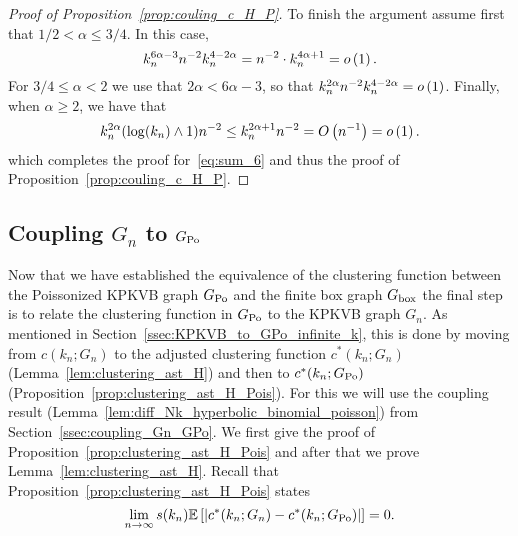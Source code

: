 \begin{proof}[Proof of Proposition~\ref{prop:couling_c_H_P}]
To finish the argument assume first that $1/2 <\alpha \leq 3/4$. In this case,
\[
	k_n^{6\alpha -3}  n^{-2} k_n^{4 - 2\alpha} = 
	n^{-2} \cdot k_n^{4\alpha +1} = o\left(1\right).
\]
For $3/4 \le \alpha < 2$ we use that $2\alpha < 6\alpha - 3$, so that $k_n^{2\alpha} n^{-2} k_n^{4 - 2\alpha} = o\left(1\right)$. Finally, when $\alpha \geq 2$, we have that
\[
	k_n^{2\alpha} (\log(k_n) \wedge 1) n^{-2} \le k_n^{2\alpha + 1} n^{-2} = O\left(n^{-1}\right) = o\left(1\right).
\] 
which completes the proof for~\eqref{eq:sum_6} and thus the proof of Proposition~\ref{prop:couling_c_H_P}.
\end{proof}

\subsection{Coupling $G_n$ to $G_{{\mathrm{Po}}}$}\label{ssec:coupling_H_HP}

Now that we have established the equivalence of the clustering function between the Poissonized KPKVB graph $G_{{\mathrm{Po}}}$ and the finite box graph $G_{\mathrm{box}}$ the final step is to relate the clustering function in $G_{{\mathrm{Po}}}$ to the KPKVB graph $G_n$. As mentioned in Section~\ref{ssec:KPKVB_to_GPo_infinite_k}, this is done by moving from $c(k_n; G_n)$ to the adjusted clustering function $c^\ast(k_n; G_n)$ (Lemma~\ref{lem:clustering_ast_H}) and then to $c^\ast(k_n; G_{{\mathrm{Po}}})$ (Proposition~\ref{prop:clustering_ast_H_Pois}). For this we will use the coupling result (Lemma~\ref{lem:diff_Nk_hyperbolic_binomial_poisson}) from Section~\ref{ssec:coupling_Gn_GPo}. We first give the proof of Proposition~\ref{prop:clustering_ast_H_Pois} and after that we prove Lemma~\ref{lem:clustering_ast_H}. Recall that Proposition~\ref{prop:clustering_ast_H_Pois} states
\[
	\lim_{n \to \infty} s(k_n)\mathbb{E}\left[\left|c^\ast(k_n; G_n) - c^\ast(k_n; G_{{\mathrm{Po}}})\right|\right] = 0.
\]


